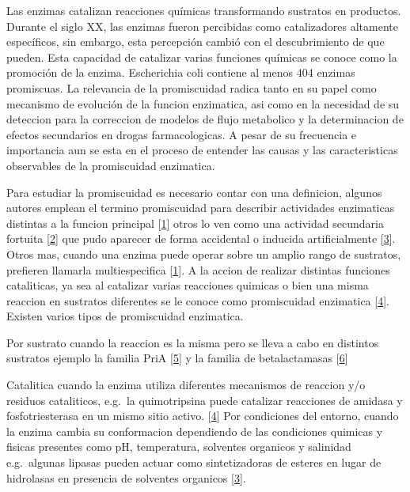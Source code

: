\documentclass[12pt,twoside]{reedthesis}
\begin{document}
  Las enzimas catalizan reacciones químicas transformando sustratos en
  productos. Durante el siglo XX, las enzimas fueron percibidas como
  catalizadores altamente específicos, sin embargo, esta percepción cambió
  con el descubrimiento de que pueden. Esta capacidad de catalizar varias
  funciones químicas se conoce como la promoción de la enzima. Escherichia
  coli contiene al menos 404 enzimas promiscuas. La relevancia de la
  promiscuidad radica tanto en su papel como mecanismo de evolución de la
  funcion enzimatica, asi como en la necesidad de su deteccion para la
  correccion de modelos de flujo metabolico y la determinacion de efectos
  secundarios en drogas farmacologicas. A pesar de su frecuencia e
  importancia aun se esta en el proceso de entender las causas y las
  caracteristicas observables de la promiscuidad enzimatica.
  
  Para estudiar la promiscuidad es necesario contar con una definicion,
  algunos autores emplean el termino promiscuidad para describir
  actividades enzimaticas distintas a la funcion principal
  {[}\protect\hyperlink{ref-khersonsky_enzyme_2010}{1}{]} otros lo ven
  como una actividad secundaria fortuita
  {[}\protect\hyperlink{ref-copley_enzymes_2003}{2}{]} que pudo aparecer
  de forma accidental o inducida artificialmente
  {[}\protect\hyperlink{ref-hult_enzyme_2007}{3}{]}. Otros mas, cuando una
  enzima puede operar sobre un amplio rango de sustratos, prefieren
  llamarla multiespecifica
  {[}\protect\hyperlink{ref-khersonsky_enzyme_2010}{1}{]}. A la accion de
  realizar distintas funciones cataliticas, ya sea al catalizar varias
  reacciones quimicas o bien una misma reaccion en sustratos diferentes se
  le conoce como promiscuidad enzimatica
  {[}\protect\hyperlink{ref-obrien_catalytic_1999}{4}{]}. Existen varios
  tipos de promiscuidad enzimatica.
  
  Por sustrato cuando la reaccion es la misma pero se lleva a cabo en
  distintos sustratos ejemplo la familia PriA
  {[}\protect\hyperlink{ref-baronagomez_occurrence_2003}{5}{]} y la
  familia de betalactamasas
  {[}\protect\hyperlink{ref-risso_phenotypic_2014}{6}{]}
  
  Catalitica cuando la enzima utiliza diferentes mecanismos de reaccion
  y/o residuos cataliticos, e.g.~la quimotripsina puede catalizar
  reacciones de amidasa y fosfotriesterasa en un mismo sitio activo.
  {[}\protect\hyperlink{ref-obrien_catalytic_1999}{4}{]} Por condiciones
  del entorno, cuando la enzima cambia su conformacion dependiendo de las
  condiciones quimicas y fisicas presentes como pH, temperatura, solventes
  organicos y salinidad e.g.~algunas lipasas pueden actuar como
  sintetizadoras de esteres en lugar de hidrolasas en presencia de
  solventes organicos {[}\protect\hyperlink{ref-hult_enzyme_2007}{3}{]}.
  
\end{document}
